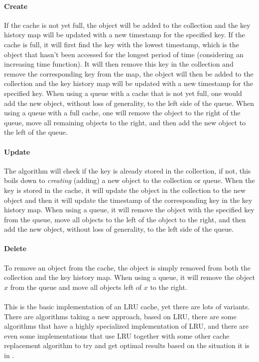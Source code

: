 \documentclass[pdftex,a4paper,12pt,twoside]{report}
\begin{document}
\paragraph{Create} If the cache is not yet full, the object will be added to the collection and the key history map will be updated with a new timestamp for the specified key. If the cache is full, it will first find the key with the lowest timestamp, which is the object that hasn't been accessed for the longest period of time (considering an increasing time function). It will then remove this key in the collection and remove the corresponding key from the map, the object will then be added to the collection and the key history map will be updated with a new timestamp for the specified key. When using a queue with a cache that is not yet full, one would add the new object, without loss of generality, to the left side of the queue. When using a queue with a full cache, one will remove the object to the right of the queue, move all remaining objects to the right, and then add the new object to the left of the queue.
\paragraph{Update} The algorithm will check if the key is already stored in the collection, if not, this boils down to \emph{creating} (adding) a new object to the collection or queue. When the key is stored in the cache, it will update the object in the collection to the new object and then it will update the timestamp of the corresponding key in the key history map. When using a queue, it will remove the object with the specified key from the queue, move all objects to the left of the object to the right, and then add the new object, without loss of generality, to the left side of the queue.
\paragraph{Delete} To remove an object from the cache, the object is simply removed from both the collection and the key history map. When using a queue, it will remove the object $x$ from the queue and move all objects left of $x$ to the right.
\\\\
This is the basic implementation of an LRU cache, yet there are lots of variants. There are algorithms taking a new approach, based on LRU, there are some algorithms that have a highly specialized implementation of LRU, and there are even some implementations that use LRU together with some other cache replacement algorithm to try and get optimal results based on the situation it is in \citep{lru_implementation}.
\end{document}

